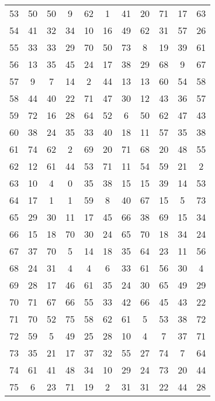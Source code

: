 \begin{table}
\begin{tabular}{c c c c c c c c c c c }
53 & 50 & 50 & 9 & 62 & 1 & 41 & 20 & 71 & 17 & 63 \\
54 & 41 & 32 & 34 & 10 & 16 & 49 & 62 & 31 & 57 & 26 \\
55 & 33 & 33 & 29 & 70 & 50 & 73 & 8 & 19 & 39 & 61 \\
56 & 13 & 35 & 45 & 24 & 17 & 38 & 29 & 68 & 9 & 67 \\
57 & 9 & 7 & 14 & 2 & 44 & 13 & 13 & 60 & 54 & 58 \\
58 & 44 & 40 & 22 & 71 & 47 & 30 & 12 & 43 & 36 & 57 \\
59 & 72 & 16 & 28 & 64 & 52 & 6 & 50 & 62 & 47 & 43 \\
60 & 38 & 24 & 35 & 33 & 40 & 18 & 11 & 57 & 35 & 38 \\
61 & 74 & 62 & 2 & 69 & 20 & 71 & 68 & 20 & 48 & 55 \\
62 & 12 & 61 & 44 & 53 & 71 & 11 & 54 & 59 & 21 & 2 \\
63 & 10 & 4 & 0 & 35 & 38 & 15 & 15 & 39 & 14 & 53 \\
64 & 17 & 1 & 1 & 59 & 8 & 40 & 67 & 15 & 5 & 73 \\
65 & 29 & 30 & 11 & 17 & 45 & 66 & 38 & 69 & 15 & 34 \\
66 & 15 & 18 & 70 & 30 & 24 & 65 & 70 & 18 & 34 & 24 \\
67 & 37 & 70 & 5 & 14 & 18 & 35 & 64 & 23 & 11 & 56 \\
68 & 24 & 31 & 4 & 4 & 6 & 33 & 61 & 56 & 30 & 4 \\
69 & 28 & 17 & 46 & 61 & 35 & 24 & 30 & 65 & 49 & 29 \\
70 & 71 & 67 & 66 & 55 & 33 & 42 & 66 & 45 & 43 & 22 \\
71 & 70 & 52 & 75 & 58 & 62 & 61 & 5 & 53 & 38 & 72 \\
72 & 59 & 5 & 49 & 25 & 28 & 10 & 4 & 7 & 37 & 71 \\
73 & 35 & 21 & 17 & 37 & 32 & 55 & 27 & 74 & 7 & 64 \\
74 & 61 & 41 & 48 & 34 & 10 & 29 & 24 & 73 & 20 & 44 \\
75 & 6 & 23 & 71 & 19 & 2 & 31 & 31 & 22 & 44 & 28 \\
\hline
\end{tabular}
\end{table}
